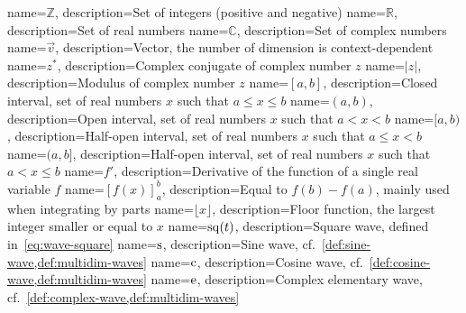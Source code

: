 {
  name={$\mathbb{Z}$},
  description={Set of integers (positive and negative)}
}
{
  name={$\mathbb{R}$},
  description={Set of real numbers}
}
{
  name={$\mathbb{C}$},
  description={Set of complex numbers}
}
{
  name={$\vec{v}$},
  description={Vector, the number of dimension is context-dependent}
}
{
  name={$z^*$},
  description={Complex conjugate of complex number $z$}
}
{
  name={$|z|$},
  description={Modulus of complex number $z$}
}
{
  name={$[a,b]$},
  description={Closed interval, \ie set of real numbers $x$ such that $a\leq x \leq b$}
}
{
  name={$(a,b)$},
  description={Open interval, \ie set of real numbers $x$ such that $a< x <b$}
}
{
  name={$[a,b)$},
  description={Half-open interval, \ie set of real numbers $x$ such that $a\leq x <b$}
}
{
  name={$(a,b]$},
  description={Half-open interval, \ie set of real numbers $x$ such that $a< x\leq b$}
}
{
  name={$f'$},
  description={Derivative of the function of a single real variable $f$}
}
{
  name={$\left[f(x)\right]_a^b$},
  description={Equal to $f(b)-f(a)$, mainly used when integrating by parts}
}
{
  name={$\lfloor x\rfloor$},
  description={Floor function, \ie the largest integer smaller or equal to $x$}
}
{
  name={$\operatorname{sq}(t)$},
  description={Square wave, defined in~\cref{eq:wave-square}}
}
{
  name={$\operatorname{s}$},
  description={Sine wave, cf.~\cref{def:sine-wave,def:multidim-waves}}
}
{
  name={$\operatorname{c}$},
  description={Cosine wave, cf.~\cref{def:cosine-wave,def:multidim-waves}}
}
{
  name={$\operatorname{e}$},
  description={Complex elementary wave, cf.~\cref{def:complex-wave,def:multidim-waves}}
}
\makeglossaries

